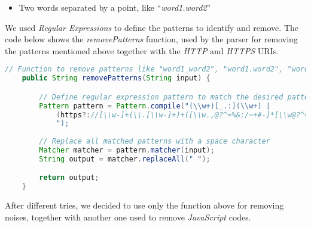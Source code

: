 \begin{itemize}
\begin{itemize}
\item Two words separated by a point, like ``\textit{word1.word2}''
\end{itemize}
We used \textit{Regular Expressions} to define the patterns to identify and remove. The code below shows the \textit{removePatterns} function, used by the parser for removing the patterns mentioned above together with the \textit{HTTP} and \textit{HTTPS} URIs.
\begin{lstlisting}[language=Java]
    // Function to remove patterns like "word1_word2", "word1.word2", "word1.word2", and HTTP/HTTPS URIs from a string
    public String removePatterns(String input) {

        // Define regular expression pattern to match the desired patterns
        Pattern pattern = Pattern.compile("(\\w+)[_.:](\\w+) |
            (https?://[\\w-]+(\\.[\\w-]+)+([\\w.,@?^=%&:/~+#-]*[\\w@?^=%&/~+#-])?)
            ");
            
        // Replace all matched patterns with a space character
        Matcher matcher = pattern.matcher(input);
        String output = matcher.replaceAll(" ");

        return output;
    }
\end{lstlisting}

After different tries, we decided to use only the function above for removing noises, together with another one used to remove \textit{JavaScript} codes.


\end{itemize}
